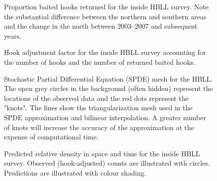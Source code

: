 \documentclass[11pt]{book}
\begin{document}
\begin{figure}[htb]

{\centering {} 

}

\caption{Proportion baited hooks returned for the inside HBLL survey. Note the substantial difference between the northern and southern areas and the change in the north between 2003--2007 and subsequent years.}\label{fig:hbll-baited}
\end{figure}
\begin{figure}[htb]

{\centering {} 

}

\caption{Hook adjustment factor for the inside HBLL survey accounting for the number of hooks and the number of returned baited hooks.}\label{fig:hbll-hook-adjustment}
\end{figure}
\begin{figure}[htb]

{\centering {} 

}

\caption{Stochastic Partial Differential Equation (SPDE) mesh for the HBLL. The open grey circles in the background (often hidden) represent the locations of the observed data and the red dots represent the "knots". The lines show the triangularization mesh used in the SPDE approximation and bilinear interpolation. A greater number of knots will increase the accuracy of the approximation at the expense of computational time.}\label{fig:hbll-spde}
\end{figure}
\begin{figure}[htb]

{\centering {} 

}

\caption{Predicted relative density in space and time for the inside HBLL survey. Observed (hook-adjusted) counts are illustrated with circles. Predictions are illustrated with colour shading.}\label{fig:hbll-predicted-spacetime}
\end{figure}
\end{document}
